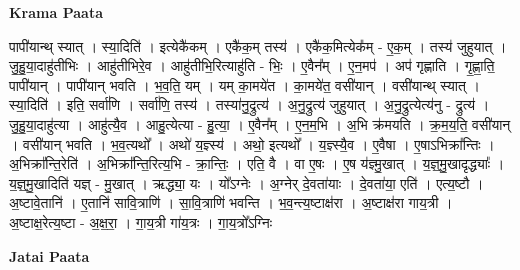 \documentclass[17pt]{extarticle}
\begin{document}
\textbf{Krama Paata} \newline

पापी॑यान्थ् स्यात् । स्या॒दिति॑ । इत्येकै॑कम् । एकै॑क॒म् तस्य॑ । एकै॑क॒मित्येक᳚म् - ए॒क॒म् । तस्य॑ जुहुयात् । जु॒हु॒या॒दाहु॑तीभिः । आहु॑तीभिरे॒व । आहु॑तीभि॒रित्याहु॑ति - भिः॒ । ए॒वैन᳚म् । ए॒न॒मप॑ । अप॑ गृह्णाति । गृ॒ह्णा॒ति॒ पापी॑यान् । पापी॑यान् भवति । भ॒व॒ति॒ यम् । यम् का॒मये॑त । का॒मये॑त॒ वसी॑यान् । वसी॑यान्थ् स्यात् । स्या॒दिति॑ । इति॒ सर्वा॑णि । सर्वा॑णि॒ तस्य॑ । तस्या॑नु॒द्रुत्य॑ । अ॒नु॒द्रुत्य॑ जुहुयात् । अ॒नु॒द्रुत्येत्य॑नु - द्रुत्य॑ । जु॒हु॒या॒दाहु॑त्या । आहु॑त्यै॒व । आहु॒त्येत्या - हु॒त्या॒ । ए॒वैन᳚म् । ए॒न॒म॒भि । अ॒भि क्र॑मयति । क्र॒म॒य॒ति॒ वसी॑यान् । वसी॑यान् भवति । भ॒व॒त्यथो᳚ । अथो॑ य॒ज्ञ्स्य॑ । अथो॒ इत्यथो᳚ । य॒ज्ञ्स्यै॒व । ए॒वैषा । ए॒षाऽभिक्रा᳚न्तिः । अ॒भिक्रा᳚न्ति॒रेति॑ । अ॒भिक्रा᳚न्ति॒रित्य॒भि - क्रा॒न्तिः॒ । एति॒ वै । वा ए॒षः । ए॒ष य॑ज्ञ्मु॒खात् । य॒ज्ञ्॒मु॒खादृद्ध्याः᳚ । य॒ज्ञ्॒मु॒खादिति॑ यज्ञ् - मु॒खात् । ऋद्ध्या॒ यः । यो᳚ऽग्नेः । अ॒ग्नेर् दे॒वता॑याः । दे॒वता॑या॒ एति॑ । एत्य॒ष्टौ । अ॒ष्टावे॒तानि॑ । ए॒तानि॑ सावि॒त्राणि॑ । सा॒वि॒त्राणि॑ भवन्ति । भ॒व॒न्त्य॒ष्टाक्ष॑रा । अ॒ष्टाक्ष॑रा गाय॒त्री । अ॒ष्टाक्ष॒रेत्य॒ष्टा - अ॒क्ष॒रा॒ । गा॒य॒त्री गा॑य॒त्रः । गा॒य॒त्रो᳚ऽग्निः \newline

\textbf{Jatai Paata} \newline
\end{document}
